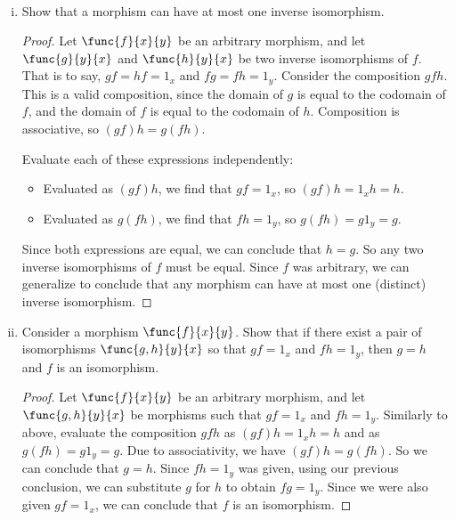 \documentclass[../../main]{subfiles}
\begin{document}
\paragraph{}
\begin{exercise}\leavevmode
	\begin{enumerate}[(i)]
		\item Show that a morphism can have at most one inverse isomorphism.
			\begin{proof}
				Let \(\func{f}{x}{y}\) be an arbitrary morphism, and let
				\(\func{g}{y}{x}\) and \(\func{h}{y}{x}\) be two inverse
				isomorphisms of \(f\). That is to say, \(gf=hf=1_{x}\) and
				\(fg=fh=1_{y}\). Consider the composition \(gfh\). This is a
				valid composition, since the domain of \(g\) is equal to the
				codomain of \(f\), and the domain of \(f\) is equal to the
				codomain of \(h\). Composition is associative, so \((gf)h =
				g(fh)\).

				Evaluate each of these expressions independently:
				\begin{itemize}
					\item Evaluated as \((gf)h\), we find that \(gf=1_{x}\), so
						\((gf)h=1_{x}h=h\).
					\item Evaluated as \(g(fh)\), we find that \(fh=1_{y}\), so
						\(g(fh)=g1_{y}=g\).
				\end{itemize}

				Since both expressions are equal, we can conclude that \(h=g\).
				So any two inverse isomorphisms of \(f\) must be equal. Since
				\(f\) was arbitrary, we can generalize to conclude that any
				morphism can have at most one (distinct) inverse isomorphism.
			\end{proof}

		\item Consider a morphism \(\func{f}{x}{y}\). Show that if there exist a
			pair of isomorphisms \(\func{g,h}{y}{x}\) so that \(gf=1_{x}\) and
			\(fh=1_{y}\), then \(g=h\) and \(f\) is an isomorphism.\\
			\begin{proof}
				Let \(\func{f}{x}{y}\) be an arbitrary morphism, and let
				\(\func{g,h}{y}{x}\) be morphisms such that \(gf=1_{x}\) and
				\(fh=1_{y}\). Similarly to above, evaluate the composition
				\(gfh\) as \((gf)h=1_{x}h=h\) and as \(g(fh)=g1_{y}=g\). Due to
				associativity, we have \((gf)h=g(fh)\). So we can conclude that \(g=h\).
				Since \(fh=1_{y}\) was given, using our previous conclusion, we can
				substitute \(g\) for \(h\) to obtain \(fg=1_{y}\). Since we were
				also given \(gf=1_{x}\), we can conclude that \(f\) is an
				isomorphism.
			\end{proof}
	\end{enumerate}
\end{exercise}
\end{document}
